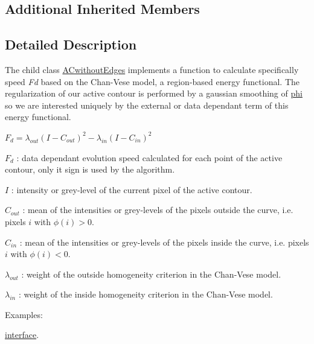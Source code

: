 \subsection*{Additional Inherited Members}


\subsection{Detailed Description}
The child class \hyperlink{classofeli_1_1_a_cwithout_edges}{A\-Cwithout\-Edges} implements a function to calculate specifically speed {\itshape Fd} based on the Chan-\/\-Vese model, a region-\/based energy functional. The regularization of our active contour is performed by a gaussian smoothing of \hyperlink{classofeli_1_1_active_contour_aacb03a6ded4ca51cb52f58aeff955ef7}{phi} so we are interested uniquely by the external or data dependant term of this energy functional.\par
\par
 $F_{d}=\lambda _{out}\left( I-C_{out}\right) ^{2}- \lambda _{in}\left( I-C_{in}\right) ^{2}$ \par
\par

\begin{DoxyItemize}
\item $F_{d}$ \-: data dependant evolution speed calculated for each point of the active contour, only it sign is used by the algorithm. \par

\item $I$ \-: intensity or grey-\/level of the current pixel of the active contour. \par

\item $C_{out}$ \-: mean of the intensities or grey-\/levels of the pixels outside the curve, i.\-e. pixels $i$ with $\phi \left( i\right) >0$. \par

\item $C_{in}$ \-: mean of the intensities or grey-\/levels of the pixels inside the curve, i.\-e. pixels $i$ with $\phi \left( i\right) <0$. \par

\item $\lambda _{out}$ \-: weight of the outside homogeneity criterion in the Chan-\/\-Vese model. \par

\item $\lambda _{in}$ \-: weight of the inside homogeneity criterion in the Chan-\/\-Vese model. 
\end{DoxyItemize}\begin{Desc}
\item[Examples\-: ]\par
\hyperlink{interface-example}{interface}.\end{Desc}


